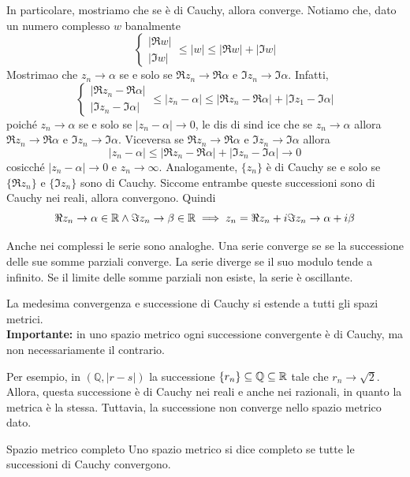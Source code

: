 \documentclass[a4paper]{article}
\begin{document}
In particolare, mostriamo che se è di Cauchy, allora converge.
Notiamo che, dato un numero complesso \(w\) banalmente
\[
    \begin{cases}
        |\Re w| \\ |\Im w|
    \end{cases}
    \leq |w| \leq |\Re w| + |\Im w|
\]
Mostrimao che \(z_n \to \alpha\) se e solo se \(\Re z_n \to \Re \alpha\)
e \(\Im z_n \to \Im \alpha\).
Infatti,
\[
    \begin{cases}
        |\Re z_n - \Re \alpha| \\ |\Im z_n - \Im \alpha|
    \end{cases}
    \leq |z_n - \alpha| \leq |\Re z_n - \Re \alpha| + |\Im z_1 - \Im \alpha|
\]
poiché \(z_n \to \alpha\) se e solo se \(|z_n - \alpha| \to 0\),
le dis di sind ice che se \(z_n \to \alpha\)
allora \(\Re z_n \to \Re \alpha\) e
\(\Im z_n \to \Im \alpha\).
Viceversa se \(\Re z_n \to \Re \alpha\) e \(\Im z_n \to \Im \alpha\)
allora
\[
    |z_n - \alpha| \leq |\Re z_n - \Re \alpha| + |\Im z_n - \Im \alpha| \to 0
\]
cosicché \(|z_n - \alpha| \to 0\) e \(z_n \to \infty\).
Analogamente, \(\{z_n\}\) è di Cauchy se e solo se \(\{\Re z_n\}\)
e \(\{\Im z_n\}\) sono di Cauchy.
Siccome entrambe queste successioni sono di Cauchy nei reali, allora convergono.
Quindi \[
    \Re z_n \to \alpha \in \mathbb{R} \land 
    \Im z_n \to \beta \in \mathbb{R}
    \implies z_n = \Re z_n + i\Im z_n \to \alpha + i\beta
\]

Anche nei complessi le serie sono analoghe. Una serie converge se
se la successione delle sue somme parziali converge.
La serie diverge se il suo modulo tende a infinito. Se il limite delle somme parziali non esiste,
la serie è oscillante.

La medesima convergenza e successione di Cauchy si estende a tutti gli spazi metrici. \\
\textbf{Importante:} in uno spazio metrico ogni successione convergente è di Cauchy, ma non necessariamente il contrario.

Per esempio, in \((\mathbb{Q}, |r-s|)\) la successione \(\{r_n\} \subseteq \mathbb{Q} \subseteq \mathbb{R}\)
tale che \(r_n \to \sqrt{2}\). Allora, questa successione è di Cauchy nei reali e anche nei razionali,
in quanto la metrica è la stessa. Tuttavia, la successione non converge nello spazio metrico dato.

\begin{snippetdefinition}{Spazio metrico completo}
    Uno spazio metrico si dice completo se tutte le successioni di Cauchy convergono.
\end{snippetdefinition}
\end{document}
